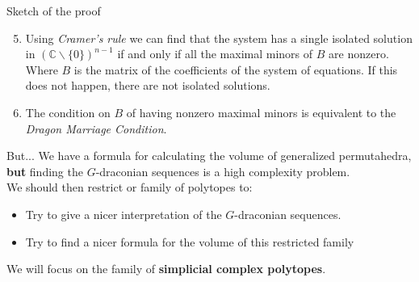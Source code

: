 \documentclass{beamer}
\begin{document}
\begin{frame}{Sketch of the proof}
\begin{enumerate}
\setcounter{enumi}{4}
    \item Using \textit{Cramer's rule} we can find that the system has a single isolated solution in $(\mathbb{C}\backslash\{0\})^{n-1}$ if and only if all the maximal minors of $B$ are nonzero. Where $B$ is the matrix of the coefficients of the system of equations. If this does not happen, there are not isolated solutions.
    \pause
\vspace{0.7cm}
    \item The condition on $B$ of having nonzero maximal minors is equivalent to the \textit{Dragon Marriage Condition}.
    
\end{enumerate}
\end{frame}

\begin{frame}{But...}
    We have a formula for calculating the volume of generalized permutahedra,
    \textbf{but} finding the $G$-draconian sequences is a high complexity problem. \\
    
    \pause
    \vspace{0.5cm}
    We should then restrict or family of polytopes to:
    \begin{itemize}
        \item Try to give a nicer interpretation of the $G$-draconian sequences.
        \item Try to find a nicer formula for the volume of this restricted family
    \end{itemize}
    \vspace{0.5cm}
    \pause
    We will focus on the family of \textbf{simplicial complex polytopes}.
\end{frame}
\end{document}
